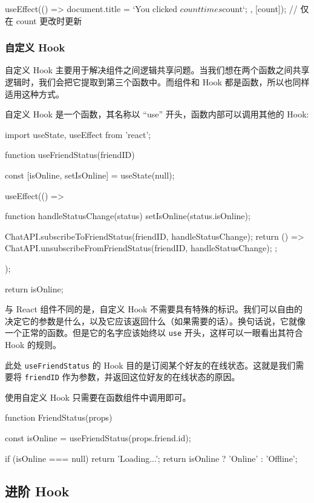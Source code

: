 \begin{JavaScript}
useEffect(() => {
  document.title = `You clicked ${count} times ${count}`;
}, [count]); // 仅在 count 更改时更新
\end{JavaScript}

\subsubsection{自定义 Hook}

自定义 Hook 主要用于解决组件之间逻辑共享问题。当我们想在两个函数之间共享逻辑时，我们会把它提取到第三个函数中。而组件和 Hook 都是函数，所以也同样适用这种方式。

自定义 Hook 是一个函数，其名称以 “use” 开头，函数内部可以调用其他的 Hook:

\begin{JavaScript}
import { useState, useEffect } from 'react';

function useFriendStatus(friendID) {
  const [isOnline, setIsOnline] = useState(null);

  useEffect(() => {
    function handleStatusChange(status) {
      setIsOnline(status.isOnline);
    }

    ChatAPI.subscribeToFriendStatus(friendID, handleStatusChange);
    return () => {
      ChatAPI.unsubscribeFromFriendStatus(friendID, handleStatusChange);
    };
  });

  return isOnline;
}
\end{JavaScript}

与 React 组件不同的是，自定义 Hook 不需要具有特殊的标识。我们可以自由的决定它的参数是什么，以及它应该返回什么（如果需要的话）。换句话说，它就像一个正常的函数。但是它的名字应该始终以 \texttt{use} 开头，这样可以一眼看出其符合 Hook 的规则。

此处 \texttt{useFriendStatus} 的 Hook 目的是订阅某个好友的在线状态。这就是我们需要将 \texttt{friendID} 作为参数，并返回这位好友的在线状态的原因。

使用自定义 Hook 只需要在函数组件中调用即可。

\begin{JavaScript}
function FriendStatus(props) {
  const isOnline = useFriendStatus(props.friend.id);

  if (isOnline === null) {
    return 'Loading...';
  }
  return isOnline ? 'Online' : 'Offline';
}
\end{JavaScript}

\subsection{进阶 Hook}

